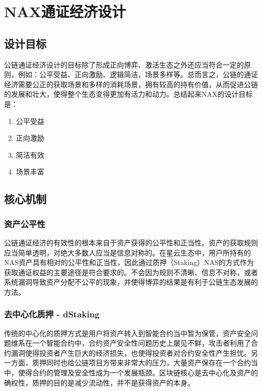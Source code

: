 \section{NAX通证经济设计}
\subsection{设计目标}
公链通证经济设计的目标除了形成正向博弈、激活生态之外还应当符合一定的原则，例如：公平受益、正向激励、逻辑简洁，场景多样等。总而言之，公链的通证经济需要公正的获取场景和多样的消耗场景，拥有较高的持有价值，从而促进公链的发展和壮大，使得整个生态变得更加有活力和动力。总结起来NAX的设计目标是：

\begin{enumerate}[\hspace{2cm}(i)]
    \item 公平受益
    \item 正向激励
    \item 简洁有效
    \item 场景丰富
\end{enumerate}

\subsection{核心机制}

\subsubsection{资产公平性}
公链通证经济的有效性的根本来自于资产获得的公平性和正当性。资产的获取规则应当简单透明，对绝大多数人应当是信息对称的。在星云生态中，用户所持有的NAS资产具有相对的公平性和正当性，因此通过质押（Staking）NAS的方式作为获取通证权益的主要途径是符合要求的。不会因为规则不清晰、信息不对称，或者系统漏洞导致资产分配不公平的现象，并使得博弈的结果是有利于公链生态发展的方法。

\subsubsection{去中心化质押 - dStaking}
传统的中心化的质押方式是用户将资产转入到智能合约当中暂为保管，资产安全问题维系在一个智能合约中，合约资产安全性问题历史上屡见不鲜，攻击者利用了合约漏洞使得投资者产生巨大的经济损失，也使得投资者对合约安全性产生担忧。另一方面，质押同时也给公链项目方带来非常大的压力，大量资产保存在一个合约当中，使得合约的管理及安全性成为一个发展瓶颈。区块链核心是去中心化及资产的确权性，质押的目的是减少流动性，并不是获得资产的本身。

